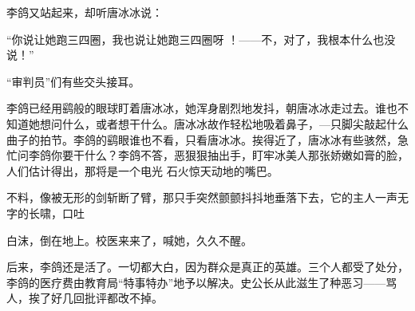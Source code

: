 \documentclass{article}
\begin{document}
李鸽又站起来，却听唐冰冰说： 

“你说让她跑三四圈，我也说让她跑三四圈呀
！——不，对了，我根本什么也没说！” 


“审判员”们有些交头接耳。 

李鸽已经用鹞般的眼球盯着唐冰冰，她浑身剧烈地发抖，朝唐冰冰走过去。谁也不知道她想问什么，或者想干什么。唐冰冰故作轻松地吸着鼻子，—只脚尖敲起什么曲子的拍节。李鸽的鹞眼谁也不看，只看唐冰冰。挨得近了，唐冰冰有些骇然，急忙问李鸽你要干什么？李鸽不答，恶狠狠抽出手，盯牢冰美人那张娇嫩如膏的脸，人们估计得出，那将是一个电光
石火惊天动地的嘴巴。 

不料，像被无形的剑斩断了臂，那只手突然颤颤抖抖地垂落下去，它的主人一声无字的长啸，口吐

\newpage
白沫，倒在地上。校医来来了，喊她，久久不醒。 

后来，李鸽还是活了。一切都大白，因为群众是真正的英雄。三个人都受了处分，李鸽的医疗费由教育局“特事特办”地予以解决。史公长从此滋生了种恶习——骂人，挨了好几回批评都改不掉。
\end{document}

